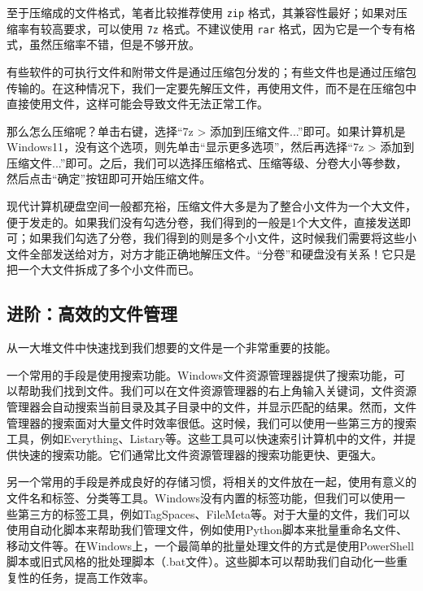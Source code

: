 至于压缩成的文件格式，笔者比较推荐使用 \texttt{zip} 格式，其兼容性最好；如果对压缩率有较高要求，可以使用 \texttt{7z} 格式。不建议使用 \texttt{rar} 格式，因为它是一个专有格式，虽然压缩率不错，但是不够开放。

\begin{caution}
  有些软件的可执行文件和附带文件是通过压缩包分发的；有些文件也是通过压缩包传输的。在这种情况下，我们一定要先解压文件，再使用文件，而不是在压缩包中直接使用文件，这样可能会导致文件无法正常工作。
\end{caution}

那么怎么压缩呢？单击右键，选择“7z > 添加到压缩文件...”即可。如果计算机是Windows11，没有这个选项，则先单击“显示更多选项”，然后再选择“7z > 添加到压缩文件...”即可。之后，我们可以选择压缩格式、压缩等级、分卷大小等参数，然后点击“确定”按钮即可开始压缩文件。

现代计算机硬盘空间一般都充裕，压缩文件大多是为了整合小文件为一个大文件，便于发走的。如果我们没有勾选分卷，我们得到的一般是1个大文件，直接发送即可；如果我们勾选了分卷，我们得到的则是多个小文件，这时候我们需要将这些小文件全部发送给对方，对方才能正确地解压文件。“分卷”和硬盘没有关系！它只是把一个大文件拆成了多个小文件而已。

\subsection{进阶：高效的文件管理}

从一大堆文件中快速找到我们想要的文件是一个非常重要的技能。

一个常用的手段是使用搜索功能。Windows文件资源管理器提供了搜索功能，可以帮助我们找到文件。我们可以在文件资源管理器的右上角输入关键词，文件资源管理器会自动搜索当前目录及其子目录中的文件，并显示匹配的结果。然而，文件管理器的搜索面对大量文件时效率很低。这时候，我们可以使用一些第三方的搜索工具，例如Everything、Listary等。这些工具可以快速索引计算机中的文件，并提供快速的搜索功能。它们通常比文件资源管理器的搜索功能更快、更强大。

另一个常用的手段是养成良好的存储习惯，将相关的文件放在一起，使用有意义的文件名和标签、分类等工具。Windows没有内置的标签功能，但我们可以使用一些第三方的标签工具，例如TagSpaces、FileMeta等。对于大量的文件，我们可以使用自动化脚本来帮助我们管理文件，例如使用Python脚本来批量重命名文件、移动文件等。在Windows上，一个最简单的批量处理文件的方式是使用PowerShell脚本或旧式风格的批处理脚本（.bat文件）。这些脚本可以帮助我们自动化一些重复性的任务，提高工作效率。

